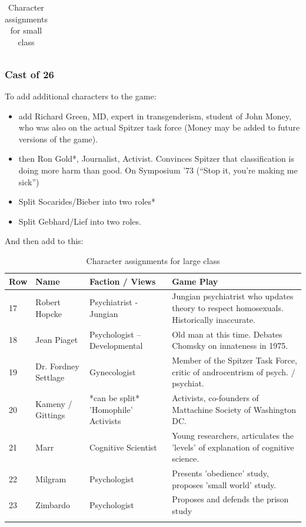 \begin{longtable}[!t]{ | p{1cm} | p{2cm} | p{2cm} | p{2cm} | }
\caption{Character assignments for small class}
\label{table: charactersmall}
\end{longtable}

\subsubsection{Cast of 26}
\label{castof26}

To add additional characters to the game:

\begin{itemize}
\item add Richard Green, MD, expert in transgenderism, student of John Money, who was also on the actual Spitzer task force (Money may be added to future versions of the game).

\item then Ron Gold*, Journalist, Activist. Convinces Spitzer that classification is doing more harm than good. On Symposium '73 (“Stop it, you're making me sick”)

\item Split Socarides\slash  Bieber into two roles*

\item Split Gebhard\slash  Lief into two roles.

\end{itemize}

And then add to this:
 \begin{longtable}[!t]{ | p{1cm} | p{2cm} | p{2cm} | p{2cm} | }
\hline 
Row&Name&Faction / Views&Game Play \\ \hline
17 &
Robert Hopcke&
Psychiatrist - Jungian&
Jungian psychiatrist who updates theory to respect homosexuals. Historically inaccurate.\\
18&
Jean Piaget&
Psychologist – Developmental&
Old man at this time. Debates Chomsky on innateness in 1975.\\
19&
Dr. Fordney Settlage&
Gynecologist&
Member of the Spitzer Task Force, critic of androcentrism of psych. / psychiat.\\
20&
Kameny / Gittings&
*can be split*\newline
'Homophile' Activists&
Activists, co-founders of Mattachine Society of Washington DC.\\
21&
Marr&
Cognitive Scientist&
Young researchers, articulates the 'levels' of explanation of cognitive science.\\
22&
Milgram&
Psychologist&
Presents 'obedience' study, proposes 'small world' study.\\
23&
Zimbardo&
Psychologist&
Proposes and defends the prison study\\
\caption{Character assignments for large class}
\label{table: characterlarge}
\end{longtable}

